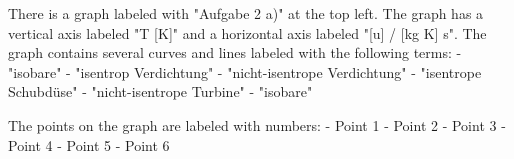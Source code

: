 There is a graph labeled with "Aufgabe 2 a)" at the top left. The graph has a vertical axis labeled "T [K]" and a horizontal axis labeled "[u] / [kg K] s". The graph contains several curves and lines labeled with the following terms:
- "isobare"
- "isentrop Verdichtung"
- "nicht-isentrope Verdichtung"
- "isentrope Schubdüse"
- "nicht-isentrope Turbine"
- "isobare"

The points on the graph are labeled with numbers:
- Point 1
- Point 2
- Point 3
- Point 4
- Point 5
- Point 6